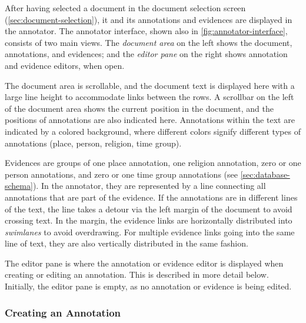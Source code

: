 After having selected a document in the document selection screen (\cref{sec:document-selection}), it and its annotations and evidences are displayed in the annotator.
The annotator interface, shown also in \cref{fig:annotator-interface}, consists of two main views.
The \emph{document area} on the left shows the document, annotations, and evidences;
and the \emph{editor pane} on the right shows annotation and evidence editors, when open.

The document area is scrollable, and the document text is displayed here with a large line height to accommodate links between the rows.
A scrollbar on the left of the document area shows the current position in the document, and the positions of annotations are also indicated here.
Annotations within the text are indicated by a colored background, where different colors signify different types of annotations (place, person, religion, time group).

Evidences are groups of one place annotation, one religion annotation, zero or one person annotations, and zero or one time group annotations (see \cref{sec:database-schema}).
In the annotator, they are represented by a line connecting all annotations that are part of the evidence.
If the annotations are in different lines of the text, the line takes a detour via the left margin of the document to avoid crossing text.
In the margin, the evidence links are horizontally distributed into \emph{swimlanes} to avoid overdrawing.
For multiple evidence links going into the same line of text, they are also vertically distributed in the same fashion.

The editor pane is where the annotation or evidence editor is displayed when creating or editing an annotation.
This is described in more detail below.
Initially, the editor pane is empty, as no annotation or evidence is being edited.


\subsubsection{Creating an Annotation}
\label{sec:annotation-creation}

